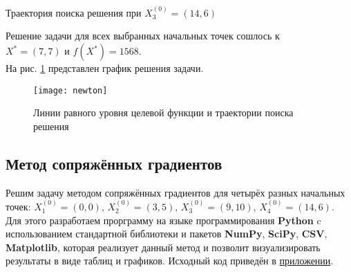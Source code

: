\begin{table}[H]
\begin{center}
	\caption{Траектория поиска решения при $X_3^{(0)} = (14, 6)$}
	\label{tab:trajectory-newton-3}
	\def\tabcolsep{10pt}
	\def\arraystretch{1.23}
	\fontsize{13}{14}\selectfont
\end{center}
\end{table}

Решение задачи для всех выбранных начальных точек сошлось к\\ $X^* = (7, 7)$ и $f(X^*) = 1568$.\\

На рис. \ref{pic:newton} представлен график решения задачи.

\begin{figure}[H]
\begin{center}
	\texttt{[image: newton]}
	\caption{Линии равного уровня целевой функции и траектории поиска решения}
	\label{pic:newton}
\end{center}
\end{figure}

\subsection{Метод сопряжённых градиентов}

Решим задачу методом сопряжённых градиентов для четырёх разных начальных точек: $X_1^{(0)} = (0, 0)$, $X_2^{(0)} = (3, 5)$, $X_3^{(0)} = (9, 10)$, $X_4^{(0)} = (14, 6)$.\\

Для этого разработаем прорграмму на языке программирования \textbf{Python} c использованием стандартной библиотеки и пакетов \textbf{NumPy}, \textbf{SciPy}, \textbf{CSV}, \textbf{Matplotlib}, которая реализует данный метод и позволит визуализировать результаты в виде таблиц и графиков.  Исходный код приведён в \hyperref[sec:application]{приложении}.\\

